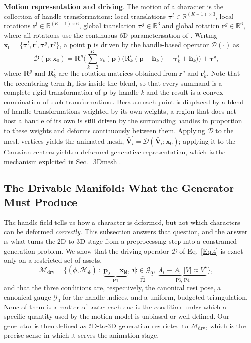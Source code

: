 \documentclass[lettersize,journal]{IEEEtran}
\newcommand{\blu}[1]{\texorpdfstring{{\leavevmode\color{blue}#1}}{#1}}
\begin{document}
\textbf{Motion representation and driving}. The motion of a character is the collection of
handle transformations: local translations $\bm{\tau}^{l} \in \mathbb{R}^{(K-1) \times 3}$,
local rotations $\bm{r}^{l} \in \mathbb{R}^{(K-1) \times 6}$, global translation
$\bm{\tau}^{g} \in \mathbb{R}^{3}$ and global rotation $\bm{r}^{g} \in \mathbb{R}^{6}$, where
all rotations use the continuous 6D parameterisation of \cite{zhou2019continuity}. Writing
$\bm{x}_{0}=\{\bm{\tau}^{l},\bm{r}^{l},\bm{\tau}^{g},\bm{r}^{g}\}$, a point $\bm{p}$ is
driven by the handle-based operator $\mathcal{D}(\cdot)$ as
\begin{equation} \label{Eq.4}
\mathcal{D}(\bm{p};\bm{x}_{0})=
\bm{R}^{g}\Big( \sum_{k=2}^{K} s_{k}(\bm{p})
\big( \bm{R}^{l}_{k}(\bm{p}-\bm{h}_{k}) + \bm{\tau}^{l}_{k} + \bm{h}_{k} \big) \Big)
+ \bm{\tau}^{g},
\end{equation}
where $\bm{R}^{g}$ and $\bm{R}^{l}_{k}$ are the rotation matrices obtained from
$\bm{r}^{g}$ and $\bm{r}^{l}_{k}$. Note that the recentering term $\bm{h}_{k}$ lies inside
the blend, so that every summand is a complete rigid transformation of $\bm{p}$ by handle
$k$ and the result is a convex combination of such transformations. Because each point is
displaced by a blend of handle transformations weighted by its own \blu{weights, a region that
does not host a handle of its own is still driven by the surrounding handles in proportion to
these} weights and deforms continuously between them. Applying $\mathcal{D}$ to the mesh
vertices yields the animated mesh, $\bar{\bm{V}}_{i}^{'}=\mathcal{D}(\bar{\bm{V}}_{i};\bm{x}_{0})$;
applying it to the Gaussian centers yields a deformed generative representation, which is the
mechanism exploited in Sec.~\ref{3Dmesh}.

\subsection{The Drivable Manifold: What the Generator Must Produce} \label{sec:drivable}
The handle field tells us how a character is deformed, but not which characters can be
deformed \textit{correctly}. This subsection answers that question, and the answer is what
turns the 2D-to-3D stage from a preprocessing step into a constrained generation problem.
We show that the driving operator $\mathcal{D}$ of Eq.~\ref{Eq.4} is exact only on a
restricted set of assets,
\begin{equation} \label{Eq.mdrv}
\mathcal{M}_{\text{drv}}=
\Big\{(\phi,\mathcal{H}_{\bm{\psi}})\ :\
\underbrace{\bm{p}_{0}=\bm{x}_{\text{id}}}_{\text{P1}},\
\underbrace{\bm{\psi}\in\mathcal{G}_{0}}_{\text{P2}},\
\underbrace{A_{i}\equiv\bar{A},\ |V|\!\approx\!V^{\star}}_{\text{P3, P4}}
\Big\},
\end{equation}
and that the three conditions are, respectively, the canonical rest pose, a canonical gauge
$\mathcal{G}_{0}$ for the handle indices, and a uniform, budgeted triangulation. None of them
is a matter of taste: each one is the condition under which a specific quantity used by the
motion model is unbiased or well defined. Our generator is then defined as
2D-to-3D generation restricted to $\mathcal{M}_{\text{drv}}$, which is the precise sense in
which it serves the animation stage.
\end{document}
